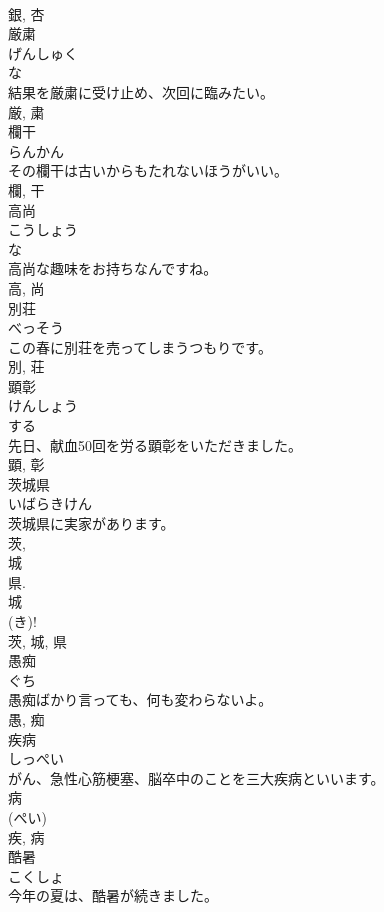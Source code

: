 \documentclass[8pt]{extreport}
\begin{document}
\begin{CJK}{UTF8}{min}
\\	銀, 杏	
\\	厳粛	
\\	げんしゅく	
\\	な 
\\	結果を厳粛に受け止め、次回に臨みたい。	
\\	厳, 粛	
\\	欄干	
\\	らんかん	
\\	その欄干は古いからもたれないほうがいい。	
\\	欄, 干	
\\	高尚	
\\	こうしょう	
\\	な 
\\	高尚な趣味をお持ちなんですね。	
\\	高, 尚	
\\	別荘	
\\	べっそう	
\\	この春に別荘を売ってしまうつもりです。	
\\	別, 荘	
\\	顕彰	
\\	けんしょう	
\\	する 
\\	先日、献血50回を労る顕彰をいただきました。	
\\	顕, 彰	
\\	茨城県	
\\	いばらきけん	
\\	茨城県に実家があります。	
\\	茨, 
\\	城 
\\	県. 
\\	城 
\\	(き)! 
\\	茨, 城, 県	
\\	愚痴	
\\	ぐち	
\\	愚痴ばかり言っても、何も変わらないよ。	
\\	愚, 痴	
\\	疾病	
\\	しっぺい	
\\	がん、急性心筋梗塞、脳卒中のことを三大疾病といいます。	
\\	病 
\\	(ぺい) 
\\	疾, 病	
\\	酷暑	
\\	こくしょ	
\\	今年の夏は、酷暑が続きました。	

\end{CJK}
\end{document}
